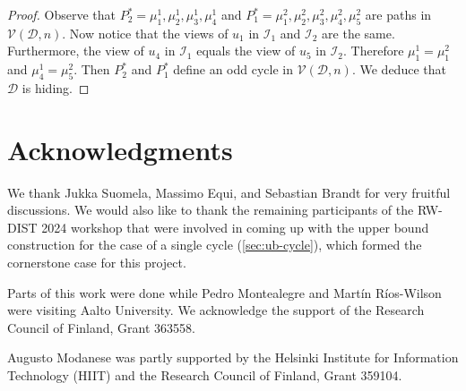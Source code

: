 \documentclass[11pt]{article}
\newcommand*{\alvgd}{\mathcal{V}(\mathcal{D},n)}
\begin{document}
\begin{proof}
Observe that $P^*_2 = \mu_1^1, \mu_2^1, \mu_3^1, \mu_4^1$ and $P^*_1 = \mu_1^2, \mu_2^2, \mu_3^2, \mu_4^2,\mu_5^2$ are paths in $\alvgd$. Now notice that the views of $u_1$ in $\mathcal{I}_1$ and $\mathcal{I}_2$ are the same. Furthermore, the view of $u_4$ in $\mathcal{I}_1$ equals the view of $u_5$ in $\mathcal{I}_2$. Therefore $\mu_1^1 = \mu_1^2$ and $\mu_4^1 = \mu_5^2$. Then $P^*_2$ and $P^*_1$ define an odd cycle in $\alvgd$.  We deduce that $\mathcal{D}$ is hiding. 



\end{proof}

\ifanon\else
\section*{Acknowledgments}

We thank Jukka Suomela, Massimo Equi, and Sebastian Brandt for very fruitful
discussions.
We would also like to thank the remaining participants of the RW-DIST 2024
workshop that were involved in coming up with the upper bound construction for
the case of a single cycle (\cref{sec:ub-cycle}), which formed the cornerstone
case for this project.

Parts of this work were done while Pedro Montealegre and Martín Ríos-Wilson were
visiting Aalto University.
We acknowledge the support of the Research Council of Finland, Grant 363558.

Augusto Modanese was partly supported by the Helsinki Institute for Information
Technology (HIIT) and the Research Council of Finland, Grant 359104.
\fi %

\printbibliography
\end{document}
